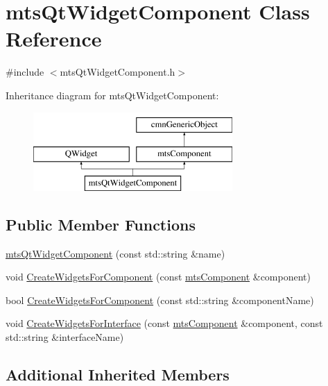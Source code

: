 \hypertarget{classmts_qt_widget_component}{}\section{mts\+Qt\+Widget\+Component Class Reference}
\label{classmts_qt_widget_component}


{\ttfamily \#include $<$mts\+Qt\+Widget\+Component.\+h$>$}

Inheritance diagram for mts\+Qt\+Widget\+Component\+:\begin{figure}[H]
\begin{center}
\leavevmode
\includegraphics[height=3.000000cm]{d2/dab/classmts_qt_widget_component}
\end{center}
\end{figure}
\subsection*{Public Member Functions}
\begin{DoxyCompactItemize}
\item 
\hyperlink{classmts_qt_widget_component_afe2a54ffefa02341c29f013b0b0b3750}{mts\+Qt\+Widget\+Component} (const std\+::string \&name)
\item 
void \hyperlink{classmts_qt_widget_component_a56fc65ef0451e13c2e0dced7430a5787}{Create\+Widgets\+For\+Component} (const \hyperlink{classmts_component}{mts\+Component} \&component)
\item 
bool \hyperlink{classmts_qt_widget_component_ae30e192e6b48e59466bffb03c0179510}{Create\+Widgets\+For\+Component} (const std\+::string \&component\+Name)
\item 
void \hyperlink{classmts_qt_widget_component_a09c5772d7fb011fa41179390b3b3de7e}{Create\+Widgets\+For\+Interface} (const \hyperlink{classmts_component}{mts\+Component} \&component, const std\+::string \&interface\+Name)
\end{DoxyCompactItemize}
\subsection*{Additional Inherited Members}


